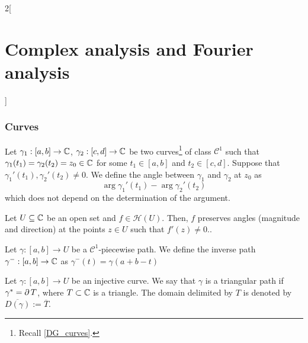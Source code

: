 \documentclass[../../../main.tex]{subfiles}
\begin{document}
\begin{multicols}{2}[\section{Complex analysis and Fourier analysis}]
  \subsubsection{Curves}
  \begin{definition}
    Let $\gamma_1:[a,b]\rightarrow\mathbb{C}$, $\gamma_2:[c,d]\rightarrow\mathbb{C}$ be two curves\footnote{Recall \cref{DG_curves}.} of class $\mathcal{C}^1$ such that $\gamma_1(t_1)=\gamma_2(t_2)=z_0\in\mathbb{C}$ for some $t_1\in[a,b]$ and $t_2\in[c,d]$. Suppose that ${\gamma_1}'(t_1),{\gamma_2}'(t_2)\ne 0$. We define the angle between $\gamma_1$ and $\gamma_2$ at $z_0$ as $$\arg{\gamma_1}'(t_1)-\arg{\gamma_2}'(t_2)$$ which does not depend on the determination of the argument.
  \end{definition}
  \begin{theorem}
    Let $U\subseteq \mathbb{C}$ be an open set and $f\in\mathcal{H}(U)$. Then, $f$ preserves angles (magnitude and direction) at the points $z\in U$ such that $f'(z)\ne 0$..
  \end{theorem}
  \begin{definition}
    Let $\gamma:[a,b]\rightarrow U$ be a $\mathcal{C}^1$-piecewise path. We define the inverse path $\gamma^-:[a,b]\rightarrow\mathbb{C}$ as $\gamma^-(t)=\gamma(a+b-t)$
  \end{definition}
  \begin{definition}
    Let $\gamma:[a,b]\rightarrow U$ be an injective curve. We say that $\gamma$ is a triangular path if $\gamma^*=\operatorname{\partial} T$, where $T\subset\mathbb{C}$ is a triangle. The domain delimited by $T$ is denoted by $\overline{D(\gamma)}:=\overline{T}$.
  \end{definition}

\end{multicols}
\end{document}
